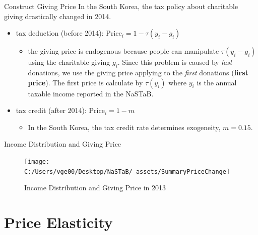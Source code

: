 \documentclass[
  ignorenonframetext,
]{beamer}
\providecommand{\tightlist}{%
  \setlength{\itemsep}{0pt}\setlength{\parskip}{0pt}}
\begin{document}
\begin{frame}{Construct Giving Price}
\protect\hypertarget{construct-giving-price}{}
In the South Korea, the tax policy about charitable giving drastically
changed in 2014.

\begin{itemize}
\tightlist
\item
  tax deduction (before 2014): \(\text{Price}_i = 1 - \tau(y_i - g_i)\)

  \begin{itemize}
  \tightlist
  \item
    the giving price is endogenous because people can manipulate
    \(\tau(y_i - g_i)\) using the charitable giving \(g_i\). Since this
    problem is caused by \emph{last} donations, we use the giving price
    applying to the \emph{first} donations (\textbf{first price}). The
    first price is calculate by \(\tau(y_i)\) where \(y_i\) is the
    annual taxable income reported in the NaSTaB.
  \end{itemize}
\item
  tax credit (after 2014): \(\text{Price}_i = 1 - m\)

  \begin{itemize}
  \tightlist
  \item
    In the South Korea, the tax credit rate determines exogeneity,
    \(m = 0.15\).
  \end{itemize}
\end{itemize}
\end{frame}

\begin{frame}{Income Distribution and Giving Price}
\protect\hypertarget{income-distribution-and-giving-price}{}
\begin{figure}
\texttt{[image: C:/Users/vge00/Desktop/NaSTaB/\_assets/SummaryPriceChange]} \caption{Income Distribution and Giving Price in 2013}\label{fig:unnamed-chunk-2}
\end{figure}
\end{frame}

\hypertarget{price-elasticity}{%
\section{Price Elasticity}\label{price-elasticity}}
\end{document}
